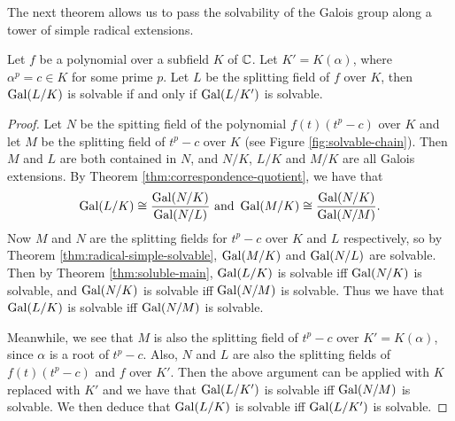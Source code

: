 The next theorem allows us to pass the solvability of the Galois group along a tower of simple radical extensions. 

%		

\begin{theorem} \label{thm:solvable:chain}
	Let $f$ be a polynomial over a subfield $K$ of $\mathbb C$. Let $K' = K(\alpha)$, where $\alpha^p = c \in K$ for some prime $p$. Let $L$ be the splitting field of $f$ over $K$, then $\operatorname{Gal}(L/K)$ is solvable if and only if $\operatorname{Gal}(L / K')$ is solvable. 
\end{theorem}



\begin{proof}
	Let $N$ be the spitting field of the polynomial $f(t)(t^p - c)$ over $K$ and let $M$ be the splitting field of $t^p -c $ over $K$ (see Figure \ref{fig:solvable-chain}). Then $M$ and $L$ are both contained in $N$, and $N/K$, $L/K$ and $M/K$ are all Galois extensions. By Theorem \ref{thm:correspondence-quotient}, we have that 
	$$ \operatorname{Gal}(L / K) \cong \frac{\operatorname{Gal}(N / K)}{\operatorname{Gal}(N / L)} \text{ and } \operatorname{Gal}(M / K) \cong \frac{\operatorname{Gal}(N / K)}{\operatorname{Gal}(N / M)}.$$
	Now $M$ and $N$ are the splitting fields for $t^p - c$ over $K$ and $L$ respectively, so by Theorem \ref{thm:radical-simple-solvable}, $\operatorname{Gal}(M/K)$ and $\operatorname{Gal}(N / L)$ are solvable. Then by Theorem \ref{thm:soluble-main}, $\operatorname{Gal}(L/K)$ is solvable iff $\operatorname{Gal}(N/K)$ is solvable, and $\operatorname{Gal}(N / K)$ is solvable iff $\operatorname{Gal}(N/M)$ is solvable. Thus we have that $\operatorname{Gal}(L/K)$ is solvable iff $\operatorname{Gal}(N/M)$ is solvable. 
	
	Meanwhile, we see that $M$ is also the splitting field of $t^p - c$ over $K' = K(\alpha)$, since $\alpha$ is a root of $t^p - c$. Also, $N$ and $L$ are also the splitting fields of $f(t) (t^p - c)$ and $f$ over $K'$. Then the above argument can be applied with $K$ replaced with $K'$ and we have that $\operatorname{Gal}(L/K')$ is solvable iff $\operatorname{Gal}(N/M)$ is solvable. We then deduce that $\operatorname{Gal}(L/K)$ is solvable iff $\operatorname{Gal}(L/K')$ is solvable. 
\end{proof}

